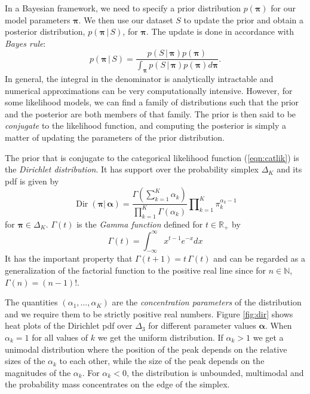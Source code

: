 \documentclass[final,3p,times,twocolumn]{elsarticle}
\DeclareMathOperator*{\Dir}{Dir}
\let\bs\boldsymbol
\begin{document}
In a Bayesian framework, we need to specify a prior distribution $p(\bs \pi)$ for our model parameters $\bs \pi$.
We then use our dataset $S$ to update the prior and obtain a posterior distribution, $p(\bs \pi\,|\,S)$, for $\bs \pi$.
The update is done in accordance with \emph{Bayes rule}:
\begin{equation}
\label{eqn:bayes}
p(\bs \pi \,|\, S) = \frac{p(S\,|\,\bs \pi) p(\bs \pi)}{\int_{\bs \pi} p(S\,|\,\bs \pi)p(\bs \pi)d\bs\pi}.
\end{equation}
In general, the integral in the denominator is analytically intractable and numerical approximations can be very computationally intensive.
However, for some likelihood models, we can find a family of distributions such that the prior and the posterior are both members of that family. 
The prior is then said to be \emph{conjugate} to the likelihood function, and computing the posterior is simply a matter of updating the parameters of the prior distribution.

The prior that is conjugate to the categorical likelihood function (\ref{eqn:catlik}) is the \emph{Dirichlet distribution}. 
It has support over the probability simplex $\Delta_K$ and its pdf is given by
\begin{equation}
\label{eqn:dirpdf}
\Dir(\bs \pi|\,\bs \alpha) = \frac{\Gamma(\sum_{k=1}^K\alpha_k)}{\prod_{k=1}^K\Gamma(\alpha_k)}\prod\nolimits_{k=1}^K\pi_k^{\alpha_k - 1} 
\end{equation}
for $\bs\pi\in\Delta_K$.
$\Gamma(t)$ is the \emph{Gamma function} defined for $t \in \mathbb{R}_+$ by 
\begin{equation*}
\Gamma(t) = \int\nolimits_{-\infty}^{\infty} x^{t-1} e^{-x} dx
\end{equation*}
It has the important property that $\Gamma(t+1) = t\,\Gamma(t)$ and can be regarded as a generalization of the factorial function to the positive real line since for $n\in \mathbb{N}$, $\Gamma(n) = (n-1)!$.

The quantities $(\alpha_1,\dots,\alpha_K)$ are the \emph{concentration parameters} of the distribution and we require them to be strictly positive real numbers. 
Figure \ref{fig:dir} shows heat plots of the Dirichlet pdf over $\Delta_3$ for different parameter values $\bs \alpha$.
When $\alpha_k = 1$ for all values of $k$ we get the uniform distribution.
If $\alpha_k  > 1$ we get a unimodal distribution where the position of the peak depends on the relative sizes of the $\alpha_k$ to each other, while the size of the peak depends on the magnitudes of the $\alpha_k$.
For $\alpha_k < 0$, the distribution is unbounded, multimodal and the probability mass concentrates on the edge of the simplex.
\end{document}
